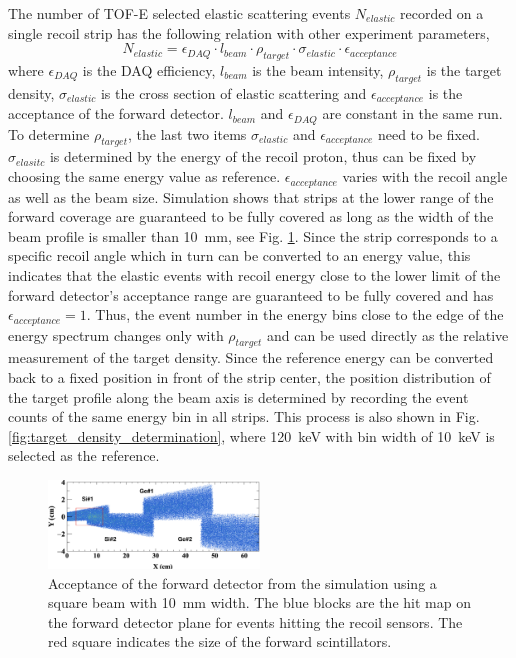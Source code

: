 \documentclass[fleqn,twocolumn,a4paper]{ikpar}
\begin{document}
The number of TOF-E selected elastic scattering events $N_{elastic}$ recorded on a single recoil strip has the
following relation with other experiment parameters,
\begin{equation}
  N_{elastic} = \epsilon_{DAQ}\cdot l_{beam}\cdot\rho_{target}\cdot\sigma_{elastic}\cdot\epsilon_{acceptance}
\end{equation}
where $\epsilon_{DAQ}$ is the DAQ efficiency, $l_{beam}$ is the beam intensity, $\rho_{target}$ is the target density,
$\sigma_{elastic}$ is the cross section of elastic scattering and
$\epsilon_{acceptance}$ is the acceptance of the forward detector.
$l_{beam}$ and $\epsilon_{DAQ}$ are constant in the same run.
To determine $\rho_{target}$, the last two items $\sigma_{elastic}$ and
$\epsilon_{acceptance}$ need to be fixed.
$\sigma_{elasitc}$ is determined by the energy of the recoil proton, thus can be
fixed by choosing the same energy value as reference.
$\epsilon_{acceptance}$ varies with the recoil angle as well as the beam size.
Simulation shows that strips at the lower range of the forward coverage are
guaranteed to be fully covered as long as the width of the beam profile is
smaller than \SI{10}{mm}, see Fig. \ref{fig:fwd_acceptance}.
Since the strip corresponds to a specific recoil angle which in turn
can be converted to an energy value, this indicates that the elastic events with recoil energy close to the lower
limit of the forward detector's acceptance range are guaranteed to be fully covered and has $\epsilon_{acceptance} = 1$.
Thus, the event number in the energy bins close to the edge of the energy
spectrum changes only with $\rho_{target}$ and can be used directly as the relative measurement of the target density.
Since the reference energy can be converted back to a fixed position in front of the
strip center, the position distribution of the target profile along the beam axis is
determined by recording the event counts of the same energy bin in all strips.
This process is also shown in Fig.\ref{fig:target_density_determination}, where \SI{120}{keV} with bin width of \SI{10}{keV} is selected as the reference.
\begin{figure}[htb!]
  \centering
	\includegraphics[width=0.5\textwidth]{./fwd_acceptance.png}
  \caption{Acceptance of the forward detector from the simulation using a square
    beam with \SI{10}{\mm} width. The blue blocks are the hit map on the forward
    detector plane for events hitting the recoil sensors. The red square indicates
    the size of the forward scintillators.}
  \label{fig:fwd_acceptance}
\end{figure}
\end{document}
